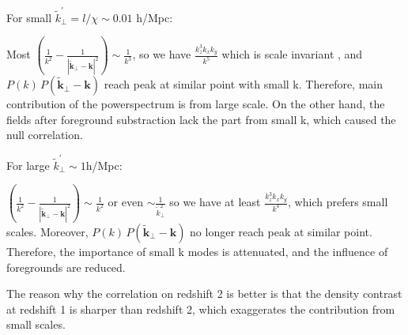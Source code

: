     For small $\tilde{k}_\perp^\prime=l/\chi\sim 0.01$ h/Mpc:
    
  Most $ (\frac{1}{k^2}-\frac{1}{|\tilde{\bm{k}}_\perp-\bm{k}|^2})
   \sim \frac{1}{k^3}$, 
   so we have $\frac{k_z^3k_xk_y}{k^5}$ which is scale invariant
   , and 
   $ P(k)\,P(\tilde{\bm{k}}_\perp-\bm{k})$
   reach peak at similar point with small k. 
   Therefore, main contribution of the powerspectrum is from large scale.
On the other hand, the fields after foreground substraction lack the part from small k, which caused the null correlation.

For large $\tilde{k}_\perp^\prime\sim 1$h/Mpc:

   $ (\frac{1}{k^2}-\frac{1}{|\tilde{\bm{k}}_\perp-\bm{k}|^2})
   \sim \frac{1}{k^2}$ or even $\sim \frac{1}{\tilde{k}_\perp^2}$
   so we have at least $\frac{k_z^3k_xk_y}{k^4}$, which prefers small scales.
   Moreover, $ P(k)\,P(\tilde{\bm{k}}_\perp-\bm{k})$
   no longer reach peak at similar point. 
Therefore, the importance of small k modes is attenuated, 
and the influence of foregrounds are reduced.

The reason why the correlation on redshift 2 is better is that 
the density contrast at redshift 1 is sharper than redshift 2, 
which exaggerates the contribution from small scales.
